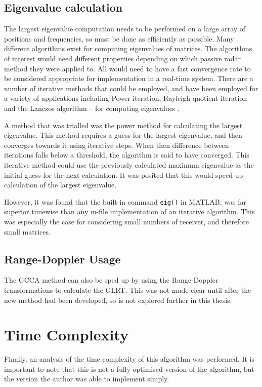 \documentclass[12pt,openany,a4paper]{book}
\begin{document}
\subsection{Eigenvalue calculation}
The largest eigenvalue computation needs to be performed on a large array of positions and frequencies, so must be done as efficiently as possible. Many different algorithms exist for computing eigenvalues of matrices. The algorithms of interest would need different properties depending on which passive radar method they were applied to. All would need to have a fast convergence rate to be considered appropriate for implementation in a real-time system. There are a number of iterative methods that could be employed, and have been employed for a variety of applications including Power iteration, Rayleigh-quotient iteration and the Lanczos algorithm – for computing eigenvalues \cite{CV17,RA18,IE19}.

\bigskip

A method that was trialled was the power method for calculating the largest eigenvalue. This method requires a guess for the largest eigenvalue, and then converges towards it using iterative steps. When then difference between iterations falls below a threshold, the algorithm is said to have converged. This iterative method could use the previously calculated maximum eigenvalue as the initial guess for the next calculation. It was posited that this would speed up calculation of the largest eigenvalue.

\bigskip

However, it was found that the built-in command \verb+eig()+ in MATLAB, was far superior timewise than any m-file implementation of an iterative algorithm. This was especially the case for considering small numbers of receiver, and therefore small matrices.

\subsection{Range-Doppler Usage}
The GCCA method can also be sped up by using the Range-Doppler transformations to calculate the GLRT. This was not made clear until after the new method had been developed, so is not explored further in this thesis.


\section{Time Complexity}
\label{sec:timecomp}
Finally, an analysis of the time complexity of this algorithm was performed. It is important to note that this is not a fully optimised version of the algorithm, but the version the author was able to implement simply.
\end{document}
